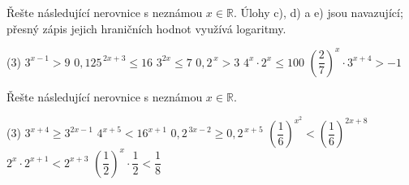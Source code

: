 \documentclass[12pt,a4paper]{article}
\begin{document}
\begin{exercise}
Řešte následující nerovnice s neznámou $x \in \mathbb{R}$.
Úlohy c), d) a e) jsou navazující; přesný zápis jejich hraničních hodnot využívá logaritmy.

\begin{tasks}(3)
    \task $3^{x-1} > 9$
    \task $0{,}125^{\,2x+3} \le 16$
    \task $3^{2x} \le 7$
    \task $0{,}2^{\,x} > 3$
    \task $4^{x} \cdot 2^{x} \le 100$
    \task $\left(\dfrac{2}{7}\right)^{x} \cdot 3^{x+4} > -1$
\end{tasks}

\end{exercise}


\begin{exercise}
Řešte následující nerovnice s neznámou $x \in \mathbb{R}$.

\begin{tasks}(3)
    \task $3^{x+4} \ge 3^{2x-1}$
    \task $4^{x+5} < 16^{x+1}$
    \task $0{,}2^{\,3x-2} \ge 0{,}2^{\,x+5}$
    \task $\left(\dfrac{1}{6}\right)^{x^{2}} < \left(\dfrac{1}{6}\right)^{2x+8}$
    \task $2^{x} \cdot 2^{x+1} < 2^{x+3}$
    \task $\left(\dfrac{1}{2}\right)^{x} \cdot \dfrac{1}{2} < \dfrac{1}{8}$
\end{tasks}
\end{exercise}
\end{document}
